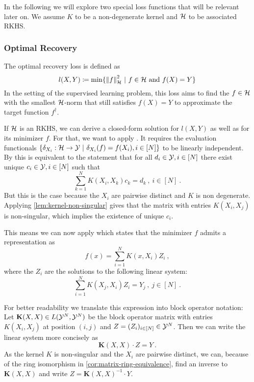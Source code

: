 In the following we will explore two special loss functions that will be relevant later on.
We assume $K$ to be a non-degenerate kernel and $\mathcal{H}$ to be associated RKHS.

\subsubsection{Optimal Recovery}
\label{sec:optimal-recovery}

The optimal recovery loss is defined as
\begin{equation}
\label{eq:optimal-recovery-loss}
l(X, Y) \coloneqq \min\{\norm{f}_{\mathcal{H}}^2 ~|~ f\in \mathcal{H} \text{~and~} f(X) = Y\}
\end{equation}
In the setting of the supervised learning problem, this loss aims to find the $f \in \mathcal{H}$ with the smallest $\mathcal{H}$-norm that still satisfies $f(X) = Y$ to approximate the target function $f^\dagger$.

If $\mathcal{H}$ is an RKHS, we can derive a closed-form solution for $l(X, Y)$ as well as for its minimizer $f$.
For that, we want to apply \cite[Theorem 3.1]{micchelli05}.
It requires the evaluation functionals $\{\delta_{X_i}: \cH \rightarrow \cY \ |\ \delta_{X_i}(f) = f(X_i), i \in [N]\}$ to be linearly independent.
By \cite[Lemma 3.1]{micchelli05} this is equivalent to the statement that for all $d_i \in \mathcal{Y}, i \in [N]$ there exist unique $c_i \in \mathcal{Y}, i \in [N]$ such that
\begin{equation}
	\sum_{k=1}^N K(X_i, X_k) c_k = d_k \ ,\ i \in [N] \ .
\end{equation}
But this is the case because the $X_i$ are pairwise distinct and $K$ is non degenerate.
Applying \cref{lem:kernel-non-singular} gives that the matrix with entries $K(X_i, X_j)$ is non-singular, which implies the existence of unique $c_i$.

This means we can now apply \cite[Theorem 3.1]{micchelli05} which states that the minimizer $f$ admits a representation as 
\begin{equation}
	\label{eq:optimal-recovery-f}
	f(x) = \sum_{i=1}^N K(x, X_i) Z_i \ ,
\end{equation}
where the $Z_i$ are the solutions to the following linear system:
\begin{equation}
	\sum_{i=1}^{N} K(X_j, X_i) Z_i = Y_j \ ,\ j \in [N] \ .
\end{equation}

For better readability we translate this expression into block operator notation:
Let $\mathbf{K}(X, X) \in L(\mathcal{Y}^N, \mathcal{Y}^N)$ be the block operator matrix with entries $K(X_i, X_j)$ at position $(i, j)$ and $Z = (Z_i)_{i \in [N]} \in \mathcal{Y}^N$.
Then we can write the linear system more concisely as 
\begin{equation}
	\mathbf{K}(X, X) \cdot Z = Y \ .
\end{equation}
As the kernel $K$ is non-singular and the $X_i$ are pairwise distinct, we can, because of the ring isomorphism in \cref{cor:matrix-ring-equivalence}, find an inverse to $\mathbf{K}(X, X)$ and write $Z = \mathbf{K}(X, X)^{-1} \cdot Y$.

